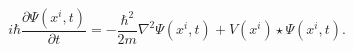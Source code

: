 \begin{equation}
i\hbar\frac{\partial\Psi(x^{i},t)}{\partial t}=-\frac{\hbar^{2}}{2m}\nabla
^{2}\Psi(x^{i},t)+V(x^{i})\star\Psi(x^{i},t).\label{26}%
\end{equation}


